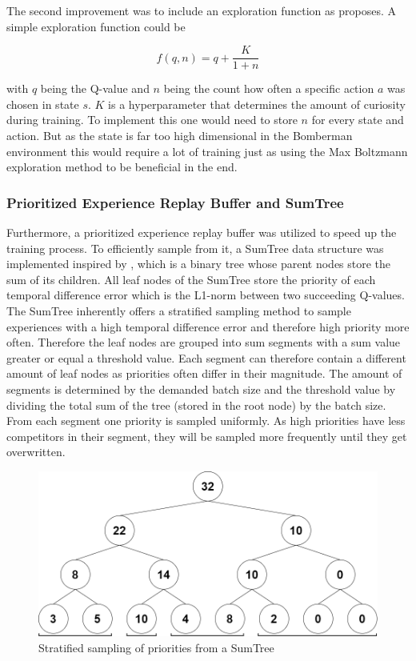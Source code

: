 The second improvement was to include an exploration function as \cite{Geron2018} proposes. A simple exploration function could be 

\begin{equation} \label{expfunc}
	f(q,n) = q + \frac{K}{1+n}
\end{equation}

with $q$ being the Q-value and $n$ being the count how often a specific action $a$ was chosen in state $s$. $K$ is a hyperparameter that determines the amount of curiosity during training. To implement this one would need to store $n$ for every state and action. But as the state is far too high dimensional in the Bomberman environment this would require a lot of training just as using the Max Boltzmann exploration method to be beneficial in the end. 

\subsubsection{Prioritized Experience Replay Buffer and SumTree}
\label{ch:approachBb}

Furthermore, a prioritized experience replay buffer was utilized to speed up the training process. To efficiently sample from it, a SumTree data structure was implemented inspired by \cite{Schaul2016}, which is a binary tree whose parent nodes store the sum of its children. All leaf nodes of the SumTree store the priority of each temporal difference error which is the L1-norm between two succeeding Q-values. The SumTree inherently offers a stratified sampling method to sample experiences with a high temporal difference error and therefore high priority more often. Therefore the leaf nodes are grouped into sum segments with a sum value greater or equal a threshold value. Each segment can therefore contain a different amount of leaf nodes as priorities often differ in their magnitude. The amount of segments is determined by the demanded batch size and the threshold value by dividing the total sum of the tree (stored in the root node) by the batch size. From each segment one priority is sampled uniformly. As high priorities have less competitors in their segment, they will be sampled more frequently until they get overwritten.  

\begin{figure}[ht]
	\centering
	\includegraphics[width=0.6\linewidth]{figures/sumtree.PNG}
	\caption{Stratified sampling of priorities from a SumTree}
	\label{fig:sumtree}
\end{figure}

